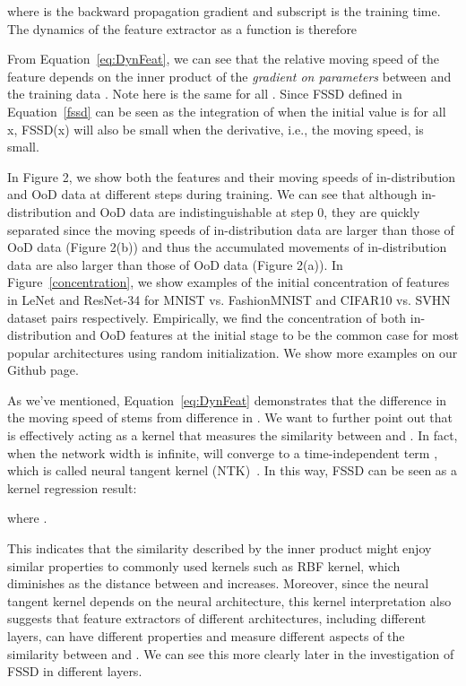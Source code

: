 \documentclass[letterpaper]{article}
\begin{document}
where  is the backward propagation gradient and subscript  is the training time.
The dynamics of the feature extractor  as a function is therefore




From Equation~\eqref{eq:DynFeat}, we can see that the relative moving speed of the feature  depends on the inner product of the \emph{gradient on parameters} between  and the training data . Note here  is the same for all . Since FSSD defined in Equation~\ref{fssd} can be seen as the integration of  when the initial value  is  for all x, FSSD(x) will also be small when the derivative, i.e., the moving speed, is small. 



In Figure 2, we show both the  features and their moving speeds of in-distribution and OoD data at different steps during training. We can see that although in-distribution and OoD data are indistinguishable at step 0, they are quickly separated since the moving speeds of in-distribution data are larger than those of OoD data (Figure 2(b)) and thus the accumulated movements of in-distribution data are also larger than those of OoD data (Figure 2(a)).
In Figure~\ref{concentration}, we show examples of the initial concentration of features in LeNet and ResNet-34 for MNIST vs. FashionMNIST and CIFAR10 vs. SVHN dataset pairs respectively. Empirically, we find the concentration of both in-distribution and OoD features at the initial stage to be the common case for most popular architectures using random initialization. We show more examples on our Github page.

As we've mentioned, Equation~\eqref{eq:DynFeat} demonstrates that the difference in the moving speed of   stems from difference in  . We want to further point out that  is effectively acting as a kernel that measures the similarity between  and . In fact, when the network width is infinite,  will converge to a  time-independent term , which is called neural tangent kernel (NTK)~\cite{NTK, ntk1, ntk2}. 
In this way, FSSD can be seen as a kernel regression result: 



 
where . 

This indicates that the similarity described by the inner product  might enjoy similar properties to commonly used kernels such as RBF kernel, which diminishes as the distance between  and  increases. Moreover, since the neural tangent kernel depends on the neural architecture, this kernel interpretation also suggests that feature extractors of different architectures, including different layers, can have different properties and measure different aspects of the similarity between  and . We can see this more clearly later in the investigation of FSSD in different layers.
\end{document}
